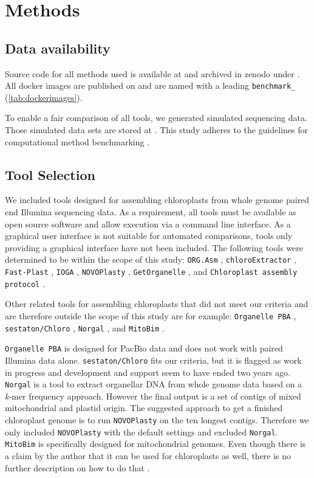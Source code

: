 \documentclass{bmcart}
\newcommand{\formatprogramnames}[1]{\texttt{#1}}
\newcommand{\ce}{\formatprogramnames{chloroExtractor}}
\newcommand{\oa}{\formatprogramnames{ORG.Asm}}
\newcommand{\fp}{\formatprogramnames{Fast-Plast}}
\newcommand{\ioga}{\formatprogramnames{IOGA}}
\newcommand{\np}{\formatprogramnames{NOVOPlasty}}
\newcommand{\go}{\formatprogramnames{GetOrganelle}}
\newcommand{\cassp}{\formatprogramnames{Chloroplast assembly protocol}}
\newcommand{\zenododataset}{\cite{zenododataset}}
\newcommand{\zenodorepo}{\cite{zenodorepo}}
\begin{document}
\section*{Methods}
\subsection*{Data availability}
Source code for all methods used is available at \cite{github-benchmark-repo} and archived in zenodo under \zenodorepo{}.
All docker images are published on \cite{dockerhub-benchmark} and are named with a leading \texttt{benchmark\_} (\cref{tab:dockerimages}).

To enable a fair comparison of all tools, we generated simulated sequencing data.
Those simulated data sets are stored at \zenododataset{}.
This study adheres to the guidelines for computational method benchmarking \cite{weber_essential_2018}.

\subsection*{Tool Selection}
We included tools designed for assembling chloroplasts from whole genome paired end Illumina sequencing data. As a requirement, all tools must be available as open source software and allow execution via a command line interface. 
As a graphical user interface is not suitable for automated comparisons, tools only providing a graphical interface have not been included.
The following tools were determined to be within the scope of this study:
\oa{} \cite{coissac_barcodes_2016}, 
\ce{} \cite{j_ankenbrand_chloroextractor:_2018}, 
\fp{} \cite{mckain__fast-plast_2017}, 
\ioga{} \cite{bakker_herbarium_2016}, 
\np{} \cite{dierckxsens_novoplasty:_2017}, 
\go{} \cite{jin_getorganelle:_2018}, and
\cassp{} \cite{sancho_comparative_2018}.

Other related tools for assembling chloroplasts that did not meet our criteria and are therefore outside the scope of this study are for example:
\texttt{Organelle PBA} \cite{Soorni2017}, \texttt{sestaton/Chloro} \cite{sestaton}, \texttt{Norgal}  \cite{Al-Nakeeb2017}, and \texttt{MitoBim} \cite{mitobim2013}.

\texttt{Organelle PBA} is designed for PacBio data and does not work with paired Illumina data alone.
\texttt{sestaton/Chloro} fits our criteria, but it is flagged as work in progress and development and support seem to have ended two years ago.
\texttt{Norgal} is a tool to extract organellar DNA from whole genome data based on a \textit{k}-mer frequency approach. However the final output is a set of contigs of mixed mitochondrial and plastid origin. The suggested approach to get a finished chloroplast genome is to run \np{} on the ten longest contigs. Therefore we only included \np{} with the default settings and excluded \texttt{Norgal}.
\texttt{MitoBim} is specifically designed for mitochondrial genomes. Even though there is a claim by the author that it can be used for chloroplasts as well, there is no further description on how to do that \cite{mitobim_issue16}.
\end{document}
